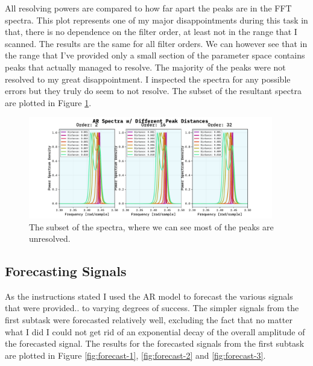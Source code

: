 \documentclass[10pt, titlepage, a4paper]{article}
\begin{document}
All resolving powers are compared to how far apart the peaks are in the FFT spectra. This plot represents one of my major disappointments
during this task in that, there is no dependence on the filter order, at least not in the range that I scanned. The results are 
the same for all filter orders. We can however see that in the range that I've provided only a small section of the parameter 
space contains peaks that actually managed to resolve. The majority of the peaks were not resolved to my great disappointment.
I inspected the spectra for any possible errors but they truly do seem to not resolve. The subset of the resultant spectra 
are plotted in Figure \ref{fig:resolving-power-spectra}.

\begin{figure}[H]
    \centering
    \includegraphics[width=0.95\textwidth]{../MaxEntropy/Images/ar-spectra.pdf}
    \caption{The subset of the spectra, where we can see most of the peaks are unresolved.}
    \label{fig:resolving-power-spectra}
\end{figure}

\subsection{Forecasting Signals}
As the instructions stated I used the AR model to forecast the various signals that were provided.. to varying 
degrees of success. The simpler signals from the first subtask were forecasted relatively well, excluding the fact that 
no matter what I did I could not get rid of an exponential decay of the overall amplitude of the forecasted signal. The results 
for the forecasted signals from the first subtask are plotted in Figure \ref{fig:forecast-1}, \ref{fig:forecast-2} and
\ref{fig:forecast-3}.
\end{document}
